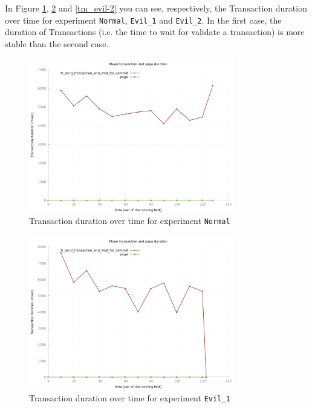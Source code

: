 \documentclass[]{article}
\begin{document}
In Figure \ref{tm_normal}, \ref{tm_evil-1} and \ref{tm_evil-2} you can see, respectively, the Transaction duration over time for experiment \texttt{Normal}, \texttt{Evil\_1} and \texttt{Evil\_2}. In the first case, the duration of Transactions (i.e. the time to wait for validate a transaction) is more stable than the second case.
\begin{figure}[h]
	\centering
	\includegraphics[width=0.8\textwidth]{images/graphes-Transactions-mean-normal.png}
	\caption{\label{tm_normal} Transaction duration over time for experiment \texttt{Normal}}
\end{figure}
\begin{figure}[h]
	\centering
	\includegraphics[width=0.8\textwidth]{images/graphes-Transactions-mean-evil_1.png}
	\caption{\label{tm_evil-1} Transaction duration over time for experiment \texttt{Evil\_1}}
\end{figure}
\end{document}
